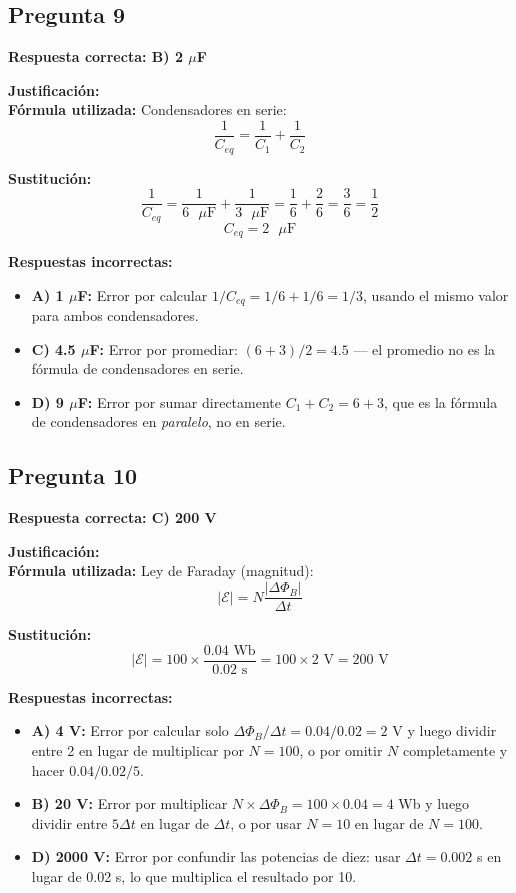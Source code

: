 \begin{respuestabox}
\subsection*{Pregunta 9}
\textcolor{verdecorrecto}{\textbf{Respuesta correcta: B) 2 $\mu$F}}

\textbf{Justificación:}\\
\textbf{Fórmula utilizada:} Condensadores en serie:
$$\frac{1}{C_{eq}} = \frac{1}{C_1} + \frac{1}{C_2}$$

\textbf{Sustitución:}
$$\frac{1}{C_{eq}} = \frac{1}{6 \text{ }\mu\text{F}} + \frac{1}{3 \text{ }\mu\text{F}} = \frac{1}{6} + \frac{2}{6} = \frac{3}{6} = \frac{1}{2}$$
$$C_{eq} = 2 \text{ }\mu\text{F}$$

\textbf{Respuestas incorrectas:}
\begin{itemize}
    \item \textbf{A) 1 $\mu$F:} Error por calcular $1/C_{eq} = 1/6 + 1/6 = 1/3$, usando el mismo valor para ambos condensadores.
    \item \textbf{C) 4.5 $\mu$F:} Error por promediar: $(6+3)/2 = 4.5$ — el promedio no es la fórmula de condensadores en serie.
    \item \textbf{D) 9 $\mu$F:} Error por sumar directamente $C_1 + C_2 = 6 + 3$, que es la fórmula de condensadores en \textit{paralelo}, no en serie.
\end{itemize}
\end{respuestabox}

\begin{respuestabox}
\subsection*{Pregunta 10}
\textcolor{verdecorrecto}{\textbf{Respuesta correcta: C) 200 V}}

\textbf{Justificación:}\\
\textbf{Fórmula utilizada:} Ley de Faraday (magnitud):
$$|\mathcal{E}| = N \frac{|\Delta\Phi_B|}{\Delta t}$$

\textbf{Sustitución:}
$$|\mathcal{E}| = 100 \times \frac{0.04 \text{ Wb}}{0.02 \text{ s}} = 100 \times 2 \text{ V} = 200 \text{ V}$$

\textbf{Respuestas incorrectas:}
\begin{itemize}
    \item \textbf{A) 4 V:} Error por calcular solo $\Delta\Phi_B / \Delta t = 0.04/0.02 = 2$ V y luego dividir entre 2 en lugar de multiplicar por $N = 100$, o por omitir $N$ completamente y hacer $0.04/0.02/5$.
    \item \textbf{B) 20 V:} Error por multiplicar $N \times \Delta\Phi_B = 100 \times 0.04 = 4$ Wb y luego dividir entre $5\Delta t$ en lugar de $\Delta t$, o por usar $N = 10$ en lugar de $N = 100$.
    \item \textbf{D) 2000 V:} Error por confundir las potencias de diez: usar $\Delta t = 0.002$ s en lugar de 0.02 s, lo que multiplica el resultado por 10.
\end{itemize}
\end{respuestabox}
